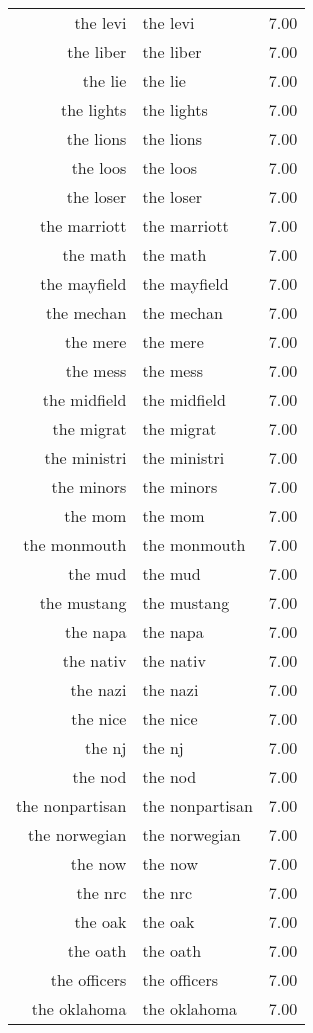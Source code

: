 \begin{table}[ht]
\begin{tabular}{rlr}
  the levi & the levi & 7.00 \\ 
  the liber & the liber & 7.00 \\ 
  the lie & the lie & 7.00 \\ 
  the lights & the lights & 7.00 \\ 
  the lions & the lions & 7.00 \\ 
  the loos & the loos & 7.00 \\ 
  the loser & the loser & 7.00 \\ 
  the marriott & the marriott & 7.00 \\ 
  the math & the math & 7.00 \\ 
  the mayfield & the mayfield & 7.00 \\ 
  the mechan & the mechan & 7.00 \\ 
  the mere & the mere & 7.00 \\ 
  the mess & the mess & 7.00 \\ 
  the midfield & the midfield & 7.00 \\ 
  the migrat & the migrat & 7.00 \\ 
  the ministri & the ministri & 7.00 \\ 
  the minors & the minors & 7.00 \\ 
  the mom & the mom & 7.00 \\ 
  the monmouth & the monmouth & 7.00 \\ 
  the mud & the mud & 7.00 \\ 
  the mustang & the mustang & 7.00 \\ 
  the napa & the napa & 7.00 \\ 
  the nativ & the nativ & 7.00 \\ 
  the nazi & the nazi & 7.00 \\ 
  the nice & the nice & 7.00 \\ 
  the nj & the nj & 7.00 \\ 
  the nod & the nod & 7.00 \\ 
  the nonpartisan & the nonpartisan & 7.00 \\ 
  the norwegian & the norwegian & 7.00 \\ 
  the now & the now & 7.00 \\ 
  the nrc & the nrc & 7.00 \\ 
  the oak & the oak & 7.00 \\ 
  the oath & the oath & 7.00 \\ 
  the officers & the officers & 7.00 \\ 
  the oklahoma & the oklahoma & 7.00 \\ 

\end{tabular}
\end{table}
